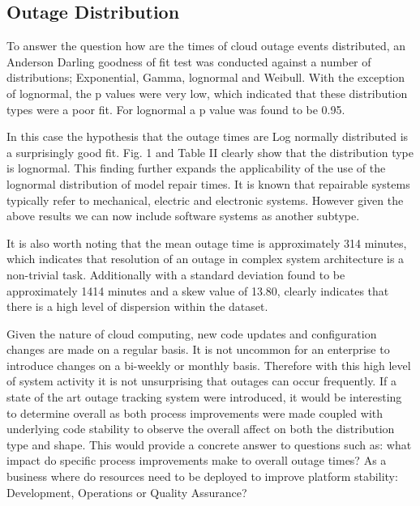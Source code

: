 \subsection{Outage Distribution}

To answer the question how are the times of cloud outage events distributed, an Anderson Darling goodness of fit test was conducted against a number of distributions; Exponential, Gamma, lognormal and Weibull. With the exception of lognormal,  the p values were very low, which indicated that these distribution types were a poor fit. For lognormal a p value was found to be 0.95. \par

In this case the hypothesis that the outage times are Log normally distributed is a surprisingly good fit. Fig. 1 and Table II clearly show that the distribution type is lognormal. This finding further expands the applicability of the use of the lognormal distribution of model repair times. It is known that repairable systems typically refer to mechanical, electric and electronic systems. However given the above results we can now include software systems as another subtype.\par

It is also worth noting that the mean outage time is approximately 314 minutes, which indicates that resolution of an outage in complex system architecture is a non-trivial task. Additionally with a standard deviation found to be approximately 1414 minutes and a skew value of 13.80, clearly indicates that there is a high level of dispersion within the dataset. \par

Given the nature of cloud computing, new code updates and configuration changes are made on a regular basis. It is not uncommon for an enterprise to introduce changes on a bi-weekly or monthly basis. Therefore with this high level of system activity it is not unsurprising that outages can occur frequently. If a state of the art outage tracking system were introduced, it would be interesting to determine overall as both process improvements were made coupled with underlying code stability to observe the overall affect on both the distribution type and shape. This would provide a concrete answer to questions such as: what impact do specific process improvements make to overall outage times? As a business where do resources need to be deployed to improve platform stability: Development, Operations or Quality Assurance? \par

